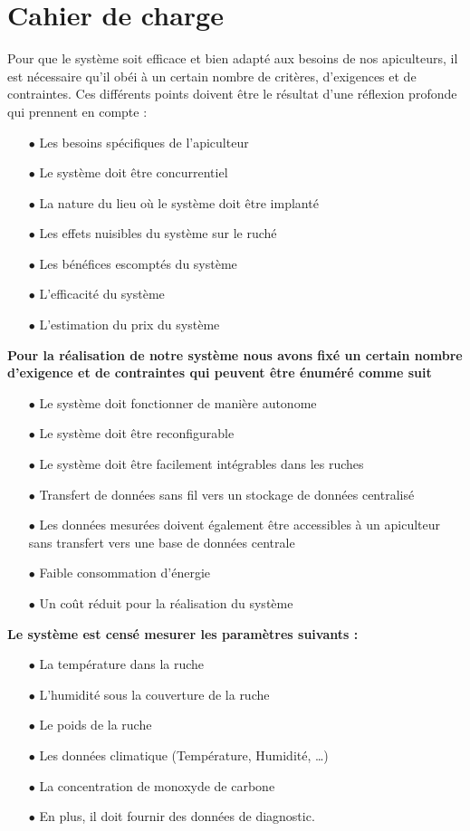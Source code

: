 \documentclass[a4paper,12pt]{report}
\begin{document}
	
	\section*{Cahier de charge}
	Pour que le système soit efficace et bien adapté aux besoins de nos apiculteurs, il
	est nécessaire qu’il obéi à un certain nombre de critères, d’exigences et de contraintes. Ces différents points doivent être le résultat d’une réflexion profonde qui prennent en compte :
	
	
	\begin{itemize}
		\item [$\bullet$] Les besoins spécifiques de l’apiculteur
		\item [$\bullet$]Le système doit être concurrentiel
		\item [$\bullet$] La nature du lieu où le système doit être implanté 
		\item [$\bullet$]Les effets nuisibles du système sur le ruché 
		\item [$\bullet$]Les bénéfices escomptés du système 
		\item [$\bullet$] L’efficacité du système 
		\item [$\bullet$] L’estimation du prix du système 
		
	\end{itemize}
	
	\textbf{Pour la réalisation de notre système nous avons fixé un certain nombre d’exigence et de contraintes qui peuvent être énuméré comme suit }
	
	\begin{itemize}
		\item [$\bullet$] Le système doit fonctionner de manière autonome  
		\item [$\bullet$] Le système doit être reconfigurable 
		\item [$\bullet$]Le système doit être facilement intégrables dans les ruches 
		\item [$\bullet$]Transfert de données sans fil vers un stockage de données centralisé 
		\item [$\bullet$] Les données mesurées doivent également être accessibles à un apiculteur sans transfert vers une base de données centrale 
		\item [$\bullet$] Faible consommation d'énergie 
		
		\item [$\bullet$]Un coût réduit pour la réalisation du système
	\end{itemize}
	\textbf{Le système est censé mesurer les paramètres suivants :}
	\begin{itemize}
		\item  [$\bullet$] La température dans la ruche 
		\item [$\bullet$] L’humidité sous la couverture de la ruche 
		\item [$\bullet$] Le poids de la ruche 
		\item [$\bullet$] Les données climatique (Température, Humidité, …) 
		\item [$\bullet$] La concentration de monoxyde de carbone 
		\item [$\bullet$] En plus, il doit fournir des données de diagnostic.
	\end{itemize}
	
	
	
	
	
	
	
	
	
	
	
	
	
	
	
	
	
\end{document}
